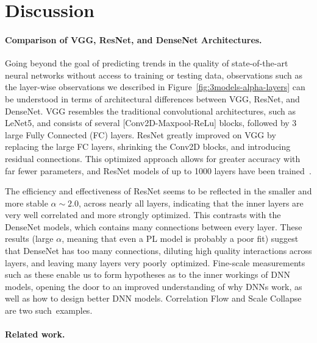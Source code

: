 \section{Discussion}


\paragraph{Comparison of VGG, ResNet, and DenseNet Architectures.}

Going beyond the goal of predicting trends in the quality of state-of-the-art neural networks without access to training or testing data, observations such as
the layer-wise observations we described in Figure~\ref{fig:3models-alpha-layers} can be understood in terms of architectural differences between VGG, ResNet, and DenseNet.
VGG resembles the traditional convolutional architectures, such as LeNet5, and consists of several [Conv2D-Maxpool-ReLu] blocks, followed by 3 large Fully Connected (FC) layers.
ResNet greatly improved on VGG by replacing the large FC layers, shrinking the Conv2D blocks, and introducing residual connections.
This optimized approach allows for greater accuracy with far fewer parameters, and ResNet models of up to 1000 layers have been trained~\cite{resnet1000}.

The efficiency and effectiveness of ResNet seems to be reflected in the smaller and more stable $\alpha\sim 2.0$, across nearly all layers, indicating that the inner layers are very well correlated and more strongly optimized.
This contrasts with the DenseNet models, which contains many connections between every layer.
These results (large $\alpha$, meaning that even a PL model is probably a poor fit) suggest that DenseNet has too many connections, diluting high quality interactions across layers, and leaving many layers very poorly~optimized.
%
Fine-scale measurements such as these enable us to form hypotheses as to the inner workings of DNN models, opening the door to an improved understanding of why DNNs work, as well as how to design better DNN models.
Correlation Flow and Scale Collapse are two such~examples.


\paragraph{Related work.}

